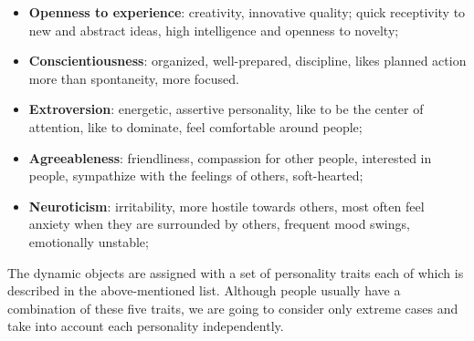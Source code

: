\begin{itemize}\label{table:opennessFacets}
  \item  \textbf{Openness to experience}: creativity, innovative quality;
          quick receptivity to new and abstract ideas, high intelligence and openness to novelty;
  \item  \textbf{Conscientiousness}: organized, well-prepared, discipline, likes planned action more than spontaneity, more focused.
  \item  \textbf{Extroversion}: energetic, assertive personality, like to be the center of attention,
          like to dominate, feel comfortable around people;
  \item  \textbf{Agreeableness}: friendliness, compassion for other people, interested in people,
          sympathize with the feelings of others, soft-hearted;
  \item  \textbf{Neuroticism}:  irritability, more hostile towards others, most often feel anxiety
          when they are surrounded by others, frequent mood swings, emotionally unstable;
  \end{itemize}

The dynamic objects are assigned with a set of personality traits each of which
is described in the above-mentioned list.
Although people usually have a combination of these five traits,
we are going to consider only extreme cases and take into account each personality independently.

